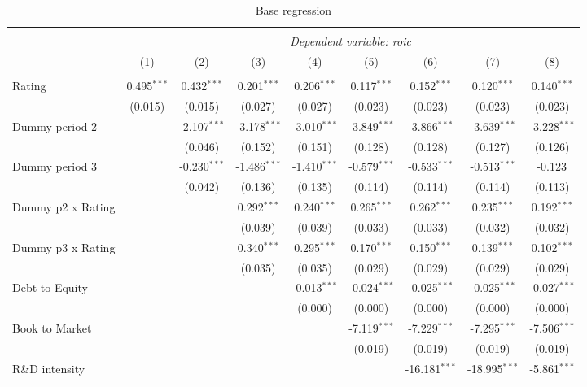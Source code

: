 \begin{table}[!htbp] \centering
  \caption{Base regression}
\begin{tabular}{@{\extracolsep{5pt}}lcccccccc}
\\[-1.8ex]\hline
\hline \\[-1.8ex]
& \multicolumn{8}{c}{\textit{Dependent variable: roic}} \
\cr \cline{2-9}
\\[-1.8ex] & (1) & (2) & (3) & (4) & (5) & (6) & (7) & (8) \\
\hline \\[-1.8ex]
 Rating & 0.495$^{***}$ & 0.432$^{***}$ & 0.201$^{***}$ & 0.206$^{***}$ & 0.117$^{***}$ & 0.152$^{***}$ & 0.120$^{***}$ & 0.140$^{***}$ \\
& (0.015) & (0.015) & (0.027) & (0.027) & (0.023) & (0.023) & (0.023) & (0.023) \\
 Dummy period 2 & & -2.107$^{***}$ & -3.178$^{***}$ & -3.010$^{***}$ & -3.849$^{***}$ & -3.866$^{***}$ & -3.639$^{***}$ & -3.228$^{***}$ \\
& & (0.046) & (0.152) & (0.151) & (0.128) & (0.128) & (0.127) & (0.126) \\
 Dummy period 3 & & -0.230$^{***}$ & -1.486$^{***}$ & -1.410$^{***}$ & -0.579$^{***}$ & -0.533$^{***}$ & -0.513$^{***}$ & -0.123$^{}$ \\
& & (0.042) & (0.136) & (0.135) & (0.114) & (0.114) & (0.114) & (0.113) \\
 Dummy p2 x Rating & & & 0.292$^{***}$ & 0.240$^{***}$ & 0.265$^{***}$ & 0.262$^{***}$ & 0.235$^{***}$ & 0.192$^{***}$ \\
& & & (0.039) & (0.039) & (0.033) & (0.033) & (0.032) & (0.032) \\
 Dummy p3 x Rating & & & 0.340$^{***}$ & 0.295$^{***}$ & 0.170$^{***}$ & 0.150$^{***}$ & 0.139$^{***}$ & 0.102$^{***}$ \\
& & & (0.035) & (0.035) & (0.029) & (0.029) & (0.029) & (0.029) \\
 Debt to Equity & & & & -0.013$^{***}$ & -0.024$^{***}$ & -0.025$^{***}$ & -0.025$^{***}$ & -0.027$^{***}$ \\
& & & & (0.000) & (0.000) & (0.000) & (0.000) & (0.000) \\
 Book to Market & & & & & -7.119$^{***}$ & -7.229$^{***}$ & -7.295$^{***}$ & -7.506$^{***}$ \\
& & & & & (0.019) & (0.019) & (0.019) & (0.019) \\
 R\&D intensity & & & & & & -16.181$^{***}$ & -18.995$^{***}$ & -5.861$^{***}$ \\

\end{tabular}
\end{table}
